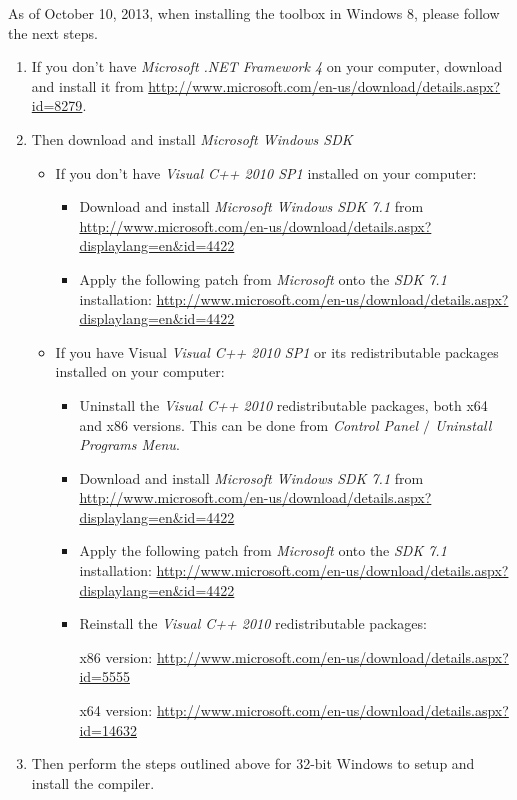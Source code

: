 \documentclass{article}
\begin{document}
As of October 10, 2013, when installing the toolbox in Windows 8, 
please follow the next steps.
\begin{enumerate}
\item If you don't have {\em Microsoft .NET Framework 4} on your computer, 
download and install it from
\url{http://www.microsoft.com/en-us/download/details.aspx?id=8279}.
\item Then download and install {\em Microsoft Windows SDK}
	\begin{itemize}
	\item If you don't have {\em Visual C++ 2010 SP1} installed on your computer:
		\begin{itemize} 
		\item Download and install {\em Microsoft Windows SDK 7.1} from
		\url{http://www.microsoft.com/en-us/download/details.aspx?displaylang=en&id=4422}
		\item Apply the following patch from {\em Microsoft} onto the {\em SDK 7.1} installation: 
          \url{http://www.microsoft.com/en-us/download/details.aspx?displaylang=en&id=4422}
		\end{itemize}
	\item If you have Visual {\em Visual C++ 2010 SP1} or its redistributable packages 
        installed on your computer:
		\begin{itemize}
		\item Uninstall the {\em Visual C++ 2010} redistributable packages, 
          both x64 and x86 versions. This can be done from 
          {\em Control Panel $/$ Uninstall Programs Menu}.
		\item Download and install {\em Microsoft Windows SDK 7.1} from
		      \url{http://www.microsoft.com/en-us/download/details.aspx?displaylang=en&id=4422}
		\item Apply the following patch from {\em Microsoft} onto the {\em SDK 7.1} installation: 
          \url{http://www.microsoft.com/en-us/download/details.aspx?displaylang=en&id=4422}	
		\item Reinstall the {\em Visual C++ 2010} redistributable packages:	
		
		x86 version:
		\url{http://www.microsoft.com/en-us/download/details.aspx?id=5555}
		
		x64 version:
		\url{http://www.microsoft.com/en-us/download/details.aspx?id=14632}
		\end{itemize}
	\end{itemize}
\item Then perform the steps outlined above for 32-bit Windows to 
      setup and install the compiler.
\end{enumerate}
\end{document}

